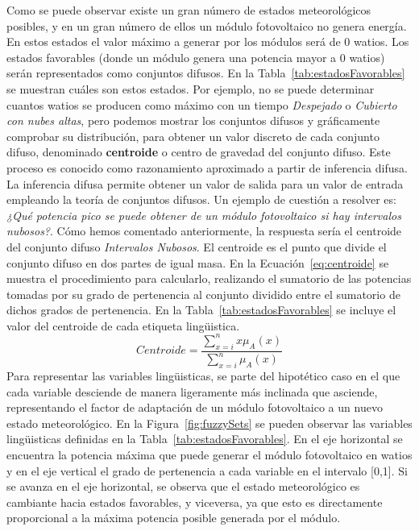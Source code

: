 Como se puede observar existe un gran número de estados meteorológicos posibles, y en un gran número de ellos un módulo fotovoltaico no genera energía. En estos estados el valor máximo a generar por los módulos será de 0 watios. Los estados favorables (donde un módulo genera una potencia mayor a 0 watios) serán representados como conjuntos difusos. En la Tabla~\ref{tab:estadosFavorables} se muestran cuáles son estos estados. Por ejemplo, no se puede determinar cuantos watios se producen como máximo con un tiempo \textit{Despejado} o \textit{Cubierto con nubes altas}, pero podemos mostrar los conjuntos difusos y gráficamente comprobar su distribución, para obtener un valor discreto de cada conjunto difuso, denominado \textbf{centroide} o centro de gravedad del conjunto difuso. Este proceso es conocido como razonamiento aproximado a partir de inferencia difusa. La inferencia difusa permite obtener un valor de salida para un valor de entrada empleando la teoría de conjuntos difusos. Un ejemplo de cuestión a resolver es: \textit{¿Qué potencia pico se puede obtener de un módulo fotovoltaico si hay intervalos nubosos?}. Cómo hemos comentado anteriormente, la respuesta sería el centroide del conjunto difuso \textit{Intervalos Nubosos}. El centroide es el punto que divide el conjunto difuso en dos partes de igual masa. En la Ecuación~\ref{eq:centroide} se muestra el procedimiento para calcularlo, realizando el sumatorio de las potencias tomadas por su grado de pertenencia al conjunto dividido entre el sumatorio de dichos grados de pertenencia. En la Tabla~\ref{tab:estadosFavorables} se incluye el valor del centroide de cada etiqueta lingüistica.\\
\begin{equation}
        \label{eq:centroide}
        Centroide = \frac{\sum_{x=i}^{n} x \mu_{A}(x)}{\sum_{x=i}^{n} \mu_{A}(x)}
\end{equation}
Para representar las variables lingüisticas, se parte del hipotético caso en el que cada variable desciende de manera ligeramente más inclinada que asciende, representando el factor de adaptación de un módulo fotovoltaico a un nuevo estado meteorológico. En la Figura~\ref{fig:fuzzySets} se pueden observar las variables lingüisticas definidas en la Tabla~\ref{tab:estadosFavorables}. En el eje horizontal se encuentra la potencia máxima que puede generar el módulo fotovoltaico en watios y en el eje vertical el grado de pertenencia a cada variable en el intervalo [0,1]. Si se avanza en el eje horizontal, se observa que el estado meteorológico es cambiante hacia estados favorables, y viceversa, ya que esto es directamente proporcional a la máxima potencia posible generada por el módulo.

